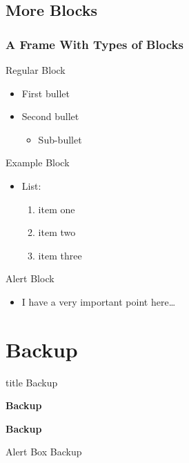 \documentclass[aspectratio=1610]{beamer}
\begin{document}
\subsection{More Blocks}
\begin{frame}
  \frametitle{A Frame With Types of Blocks}
  \begin{block}{Regular Block}
  \begin{itemize}
  \item First bullet
  \item Second bullet
    \begin{itemize}
    \item Sub-bullet
    \end{itemize}
  \end{itemize}
  \end{block}
  \begin{exampleblock}{Example Block}
  \begin{itemize}
  \item List:
    \begin{enumerate}
    \item item one
    \item item two
    \item item three
    \end{enumerate}
  \end{itemize}
  \end{exampleblock}
  \begin{alertblock}{Alert Block}
    \begin{itemize}
    \item I have a very important point here\ldots
    \end{itemize}
  \end{alertblock}
\end{frame}



\section{Backup}
\begin{NCARprettyframe}
  \vspace{3em}
  \begin{beamercolorbox}[sep=8pt,center]{title}
    \Huge{Backup}
  \end{beamercolorbox}
  \begin{exampleblock}{}
    \centering
    \textbf{Backup}
  \end{exampleblock}
  \begin{block}{}
    \centering
    \textbf{Backup}
  \end{block}
  \begin{alertblock}{}
    \centering
    Alert Box Backup
  \end{alertblock}

\end{NCARprettyframe}
\end{document}
